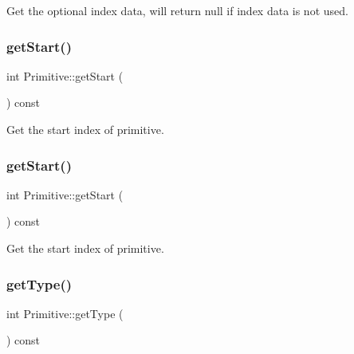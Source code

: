 Get the optional index data, will return null if index data is not used. \mbox{\label{classPrimitive_a0736b5ae5e828886f073508674956df2}} 
\subsubsection{\texorpdfstring{get\+Start()}{getStart()}\hspace{0.1cm}{\footnotesize\ttfamily [1/2]}}
{\footnotesize\ttfamily int Primitive\+::get\+Start (\begin{DoxyParamCaption}{ }\end{DoxyParamCaption}) const\hspace{0.3cm}{\ttfamily [inline]}}

Get the start index of primitive. \mbox{\label{classPrimitive_a0736b5ae5e828886f073508674956df2}} 
\subsubsection{\texorpdfstring{get\+Start()}{getStart()}\hspace{0.1cm}{\footnotesize\ttfamily [2/2]}}
{\footnotesize\ttfamily int Primitive\+::get\+Start (\begin{DoxyParamCaption}{ }\end{DoxyParamCaption}) const\hspace{0.3cm}{\ttfamily [inline]}}

Get the start index of primitive. \mbox{\label{classPrimitive_ac2080c271a744f9967849ac9c50ac232}} 
\subsubsection{\texorpdfstring{get\+Type()}{getType()}\hspace{0.1cm}{\footnotesize\ttfamily [1/2]}}
{\footnotesize\ttfamily int Primitive\+::get\+Type (\begin{DoxyParamCaption}{ }\end{DoxyParamCaption}) const\hspace{0.3cm}{\ttfamily [inline]}}

